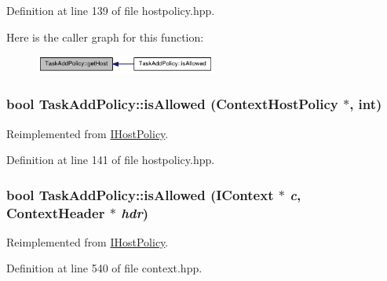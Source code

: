 Definition at line 139 of file hostpolicy.hpp.

Here is the caller graph for this function:\nopagebreak
\begin{figure}[H]
\begin{center}
\leavevmode
\includegraphics[width=168pt]{class_task_add_policy_af4a2055c79d1605f4099bdec7f4429f2_icgraph}
\end{center}
\end{figure}
\hypertarget{class_task_add_policy_a16f3ac4d4bf719e3020a4495d7498c3e}{
\subsubsection[{isAllowed}]{\setlength{\rightskip}{0pt plus 5cm}bool TaskAddPolicy::isAllowed ({\bf ContextHostPolicy} $\ast$, \/  int)}}
\label{class_task_add_policy_a16f3ac4d4bf719e3020a4495d7498c3e}


Reimplemented from \hyperlink{class_i_host_policy_ad7665cb96e008e8f189201662ae32736}{IHostPolicy}.

Definition at line 141 of file hostpolicy.hpp.\hypertarget{class_task_add_policy_a80261d7262611c29d2b483e4e73cc204}{
\subsubsection[{isAllowed}]{\setlength{\rightskip}{0pt plus 5cm}bool TaskAddPolicy::isAllowed ({\bf IContext} $\ast$ {\em c}, \/  {\bf ContextHeader} $\ast$ {\em hdr})}}
\label{class_task_add_policy_a80261d7262611c29d2b483e4e73cc204}


Reimplemented from \hyperlink{class_i_host_policy_a5200e3143a640e492438361a3fd2626a}{IHostPolicy}.

Definition at line 540 of file context.hpp.

